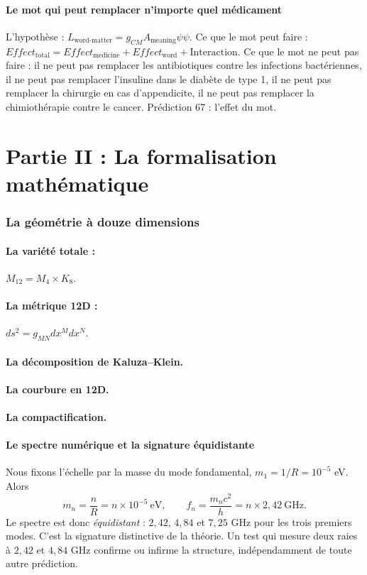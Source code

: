 \documentclass[11pt,a4paper]{article}
\begin{document}
\subsection{Le mot qui peut remplacer n'importe quel médicament}
L'hypothèse : $L_{\text{word-matter}} = g_{CM} A_{\text{meaning}} \psi \psi$. Ce que le mot peut faire : $Effect_{\text{total}} = Effect_{\text{medicine}} + Effect_{\text{word}} + \text{Interaction}$. Ce que le mot ne peut pas faire : il ne peut pas remplacer les antibiotiques contre les infections bactériennes, il ne peut pas remplacer l'insuline dans le diabète de type 1, il ne peut pas remplacer la chirurgie en cas d'appendicite, il ne peut pas remplacer la chimiothérapie contre le cancer. Prédiction 67 : l'effet du mot.

\newpage
\part*{Partie II : La formalisation mathématique}

\section{La géométrie à douze dimensions}
\subsection{La variété totale :} $M_{12} = M_4 \times K_8$.
\subsection{La métrique 12D :} $ds^2 = g_{MN} dx^M dx^N$.
\subsection{La décomposition de Kaluza--Klein.}
\subsection{La courbure en 12D.}
\subsection{La compactification.}

\subsection{Le spectre numérique et la signature équidistante}
Nous fixons l'échelle par la masse du mode fondamental, $m_1 = 1/R = 10^{-5}$ eV. Alors
\begin{equation}
m_n = \frac{n}{R} = n \times 10^{-5}\ \text{eV},
\qquad
f_n = \frac{m_n c^2}{h} = n \times 2,42\ \text{GHz}.
\end{equation}
Le spectre est donc \emph{équidistant} : $2,42$, $4,84$ et $7,25$ GHz pour les trois premiers modes. C'est la signature distinctive de la théorie. Un test qui mesure deux raies à $2,42$ et $4,84$ GHz confirme ou infirme la structure, indépendamment de toute autre prédiction.
\end{document}
